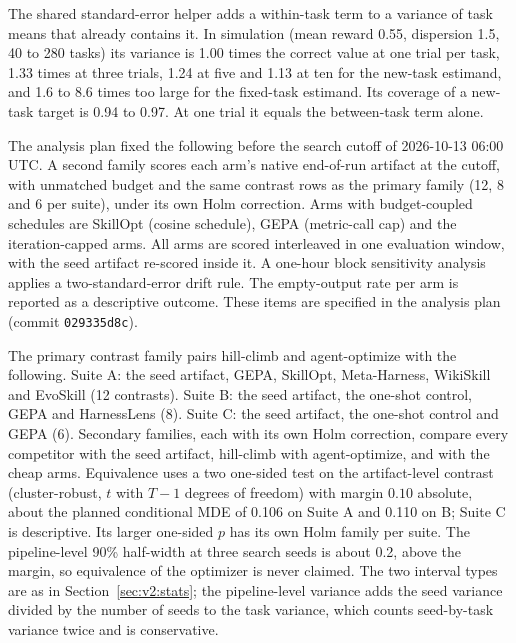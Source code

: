 The shared standard-error helper adds a within-task term to a variance of task means that already contains it. In simulation (mean reward 0.55, dispersion 1.5, 40 to 280 tasks) its variance is 1.00 times the correct value at one trial per task, 1.33 times at three trials, 1.24 at five and 1.13 at ten for the new-task estimand, and 1.6 to 8.6 times too large for the fixed-task estimand. Its coverage of a new-task target is 0.94 to 0.97. At one trial it equals the between-task term alone.


The analysis plan fixed the following before the search cutoff of 2026-10-13 06:00 UTC. A second family scores each arm's native end-of-run artifact at the cutoff, with unmatched budget and the same contrast rows as the primary family (12, 8 and 6 per suite), under its own Holm correction. Arms with budget-coupled schedules are SkillOpt (cosine schedule), GEPA (metric-call cap) and the iteration-capped arms. All arms are scored interleaved in one evaluation window, with the seed artifact re-scored inside it. A one-hour block sensitivity analysis applies a two-standard-error drift rule. The empty-output rate per arm is reported as a descriptive outcome. These items are specified in the analysis plan (commit \texttt{029335d8c}).


The primary contrast family pairs hill-climb and agent-optimize with the following. Suite A: the seed artifact, GEPA, SkillOpt, Meta-Harness, WikiSkill and EvoSkill (12 contrasts). Suite B: the seed artifact, the one-shot control, GEPA and HarnessLens (8). Suite C: the seed artifact, the one-shot control and GEPA (6). Secondary families, each with its own Holm correction, compare every competitor with the seed artifact, hill-climb with agent-optimize, and \capevolve{} with the cheap arms. Equivalence uses a two one-sided test on the artifact-level contrast (cluster-robust, $t$ with $T-1$ degrees of freedom) with margin $0.10$ absolute, about the planned conditional MDE of 0.106 on Suite A and 0.110 on B; Suite C is descriptive. Its larger one-sided $p$ has its own Holm family per suite. The pipeline-level 90\% half-width at three search seeds is about 0.2, above the margin, so equivalence of the optimizer is never claimed. The two interval types are as in Section~\ref{sec:v2:stats}; the pipeline-level variance adds the seed variance divided by the number of seeds to the task variance, which counts seed-by-task variance twice and is conservative.

